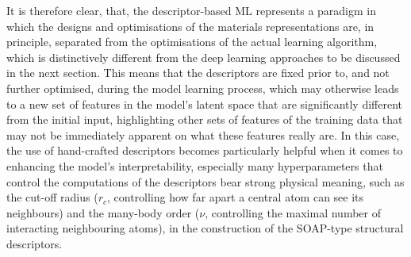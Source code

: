 It is therefore clear, that, the descriptor-based ML represents a paradigm in which the designs and optimisations of the materials representations are, in principle, separated from the optimisations of the actual learning algorithm, which is distinctively different from the deep learning approaches to be discussed in the next section. This means that the descriptors are fixed prior to, and not further optimised, during the model learning process, which may otherwise leads to a new set of features in the model's latent space that are significantly different from the initial input, highlighting other sets of features of the training data that may not be immediately apparent on what these features really are. In this case, the use of hand-crafted descriptors becomes particularly helpful when it comes to enhancing the model's interpretability, especially many hyperparameters that control the computations of the descriptors bear strong physical meaning, such as the cut-off radius ($r_c$, controlling how far apart a central atom can see its neighbours) and the many-body order ($\nu$, controlling the maximal number of interacting neighbouring atoms), in the construction of the SOAP-type structural descriptors.
